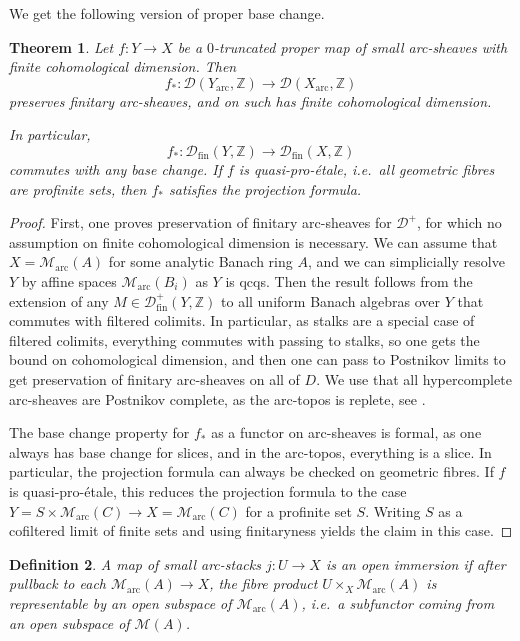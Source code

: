 \documentclass[11pt]{amsart}
\numberwithin{equation}{section}
\newtheorem{theorem}{Theorem}
\numberwithin{theorem}{section}
\newtheorem{definition}[theorem]{Definition}
\theoremstyle{definition}
\begin{document}
We get the following version of proper base change.

\begin{theorem}\label{thm:properpushforwardfinitary} Let $f: Y\to X$ be a $0$-truncated proper map of small arc-sheaves with finite cohomological dimension. Then
\[
f_\ast: \mathcal D(Y_{\mathrm{arc}},\mathbb Z)\to \mathcal D(X_{\mathrm{arc}},\mathbb Z)
\]
preserves finitary arc-sheaves, and on such has finite cohomological dimension.

In particular,
\[
f_\ast: \mathcal D_{\mathrm{fin}}(Y,\mathbb Z)\to \mathcal D_{\mathrm{fin}}(X,\mathbb Z)
\]
commutes with any base change. If $f$ is quasi-pro-\'etale, i.e.~all geometric fibres are profinite sets, then $f_\ast$ satisfies the projection formula.
\end{theorem}

\begin{proof} First, one proves preservation of finitary arc-sheaves for $\mathcal D^+$, for which no assumption on finite cohomological dimension is necessary. We can assume that $X=\mathcal M_{\mathrm{arc}}(A)$ for some analytic Banach ring $A$, and we can simplicially resolve $Y$ by affine spaces $\mathcal M_{\mathrm{arc}}(B_i)$ as $Y$ is qcqs. Then the result follows from the extension of any $M\in \mathcal D_{\mathrm{fin}}^+(Y,\mathbb Z)$ to all uniform Banach algebras over $Y$ that commutes with filtered colimits. In particular, as stalks are a special case of filtered colimits, everything commutes with passing to stalks, so one gets the bound on cohomological dimension, and then one can pass to Postnikov limits to get preservation of finitary arc-sheaves on all of $D$. We use that all hypercomplete arc-sheaves are Postnikov complete, as the arc-topos is replete, see \cite{MondalReinecke}.

The base change property for $f_\ast$ as a functor on arc-sheaves is formal, as one always has base change for slices, and in the arc-topos, everything is a slice. In particular, the projection formula can always be checked on geometric fibres. If $f$ is quasi-pro-\'etale, this reduces the projection formula to the case $Y=S\times \mathcal M_{\mathrm{arc}}(C)\to X=\mathcal M_{\mathrm{arc}}(C)$ for a profinite set $S$. Writing $S$ as a cofiltered limit of finite sets and using finitaryness yields the claim in this case.
\end{proof}

\begin{definition} A map of small arc-stacks $j: U\to X$ is an open immersion if after pullback to each $\mathcal M_{\mathrm{arc}}(A)\to X$, the fibre product $U\times_X \mathcal M_{\mathrm{arc}}(A)$ is representable by an open subspace of $\mathcal M_{\mathrm{arc}}(A)$, i.e.~a subfunctor coming from an open subspace of $\mathcal M(A)$.
\end{definition}
\end{document}
